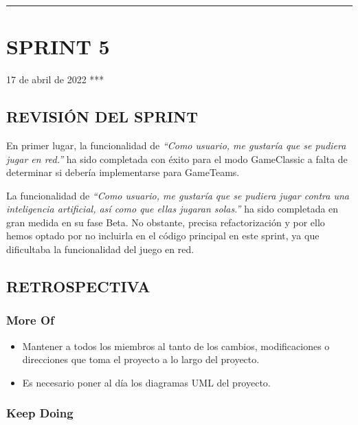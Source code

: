 \documentclass[
]{article}
\author{}
\date{}
\begin{document}
\begin{center}\rule{0.5\linewidth}{0.5pt}\end{center}

\hypertarget{sprint-5}{%
\section{SPRINT 5}\label{sprint-5}}

17 de abril de 2022 ***

\hypertarget{revisiuxf3n-del-sprint}{%
\subsection{REVISIÓN DEL SPRINT}\label{revisiuxf3n-del-sprint}}

En primer lugar, la funcionalidad de \emph{``Como usuario, me gustaría
que se pudiera jugar en red.''} ha sido completada con éxito para el
modo GameClassic a falta de determinar si debería implementarse para
GameTeams.

La funcionalidad de \emph{``Como usuario, me gustaría que se pudiera
jugar contra una inteligencia artificial, así como que ellas jugaran
solas.''} ha sido completada en gran medida en su fase Beta. No
obstante, precisa refactorización y por ello hemos optado por no
incluirla en el código principal en este sprint, ya que dificultaba la
funcionalidad del juego en red.

\hypertarget{retrospectiva}{%
\subsection{RETROSPECTIVA}\label{retrospectiva}}

\hypertarget{more-of}{%
\subsubsection{More Of}\label{more-of}}

\begin{itemize}
\item
  Mantener a todos los miembros al tanto de los cambios, modificaciones
  o direcciones que toma el proyecto a lo largo del proyecto.
\item
  Es necesario poner al día los diagramas UML del proyecto.
\end{itemize}

\hypertarget{keep-doing}{%
\subsubsection{Keep Doing}\label{keep-doing}}
\end{document}

